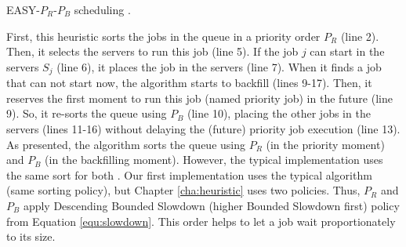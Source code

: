 \IncMargin{1em}
\begin{algorithm}[!htb]
    \LinesNumbered
    \footnotesize
    \SetAlgoLined
    \caption{EASY-$P_{R}$-$P_{B}$ scheduling \cite{lelong2018tuning}.}
    \label{alg:algo_scheduling}
\end{algorithm}
\DecMargin{1em}

First, this heuristic sorts the jobs in the queue in a priority order $P_{R}$ (line 2). Then, it selects the servers to run this job (line 5). If the job $j$ can start in the servers $S_j$ (line 6), it places the job in the servers (line 7). When it finds a job that can not start now, the algorithm starts to backfill (lines 9-17). Then, it reserves the first moment to run this job (named priority job) in the future (line 9). So, it re-sorts the queue using $P_{B}$ (line 10), placing the other jobs in the servers (lines 11-16) without delaying the (future) priority job execution (line 13). As presented, the algorithm sorts the queue using $P_{R}$ (in the priority moment) and $P_{B}$ (in the backfilling moment). However, the typical implementation uses the same sort for both \cite{lelong2018tuning}. Our first implementation uses the typical algorithm (same sorting policy), but Chapter \ref{cha:heuristic} uses two policies. Thus, $P_{R}$ and $P_{B}$ apply Descending Bounded Slowdown (higher Bounded Slowdown first) policy from Equation \ref{equ:slowdown}. This order helps to let a job wait proportionately to its size.

